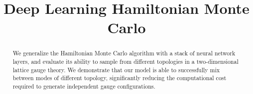 \documentclass{article} %
\title{Deep Learning Hamiltonian Monte Carlo}
\author{Sam Foreman, Xiao-Yong Jin\& James Osborn\thanks{\hyperref{%
      https://github.com/saforem2/l2hmc-qcd
   }{https://github.com/saforem2/l2hmc-qcd} \\
   Leadership Computing Facility\\
   Argonne National Laboratory\\
   Lemont, IL 60439
   \texttt{\{foremans,xjin,\}@anl.gov},%
   \texttt{\{osborn\}@alcf.anl.gov}\\
}}
\begin{document}
\maketitle

\begin{abstract}
   We generalize the Hamiltonian Monte Carlo algorithm with a stack of neural network layers,
   and evaluate its ability to sample from
   different topologies in a two-dimensional lattice gauge theory.
   We demonstrate that our model is able to successfully mix between modes of different topology,
   significantly reducing the computational cost required to generate independent gauge configurations.
\end{abstract}
\end{document}
